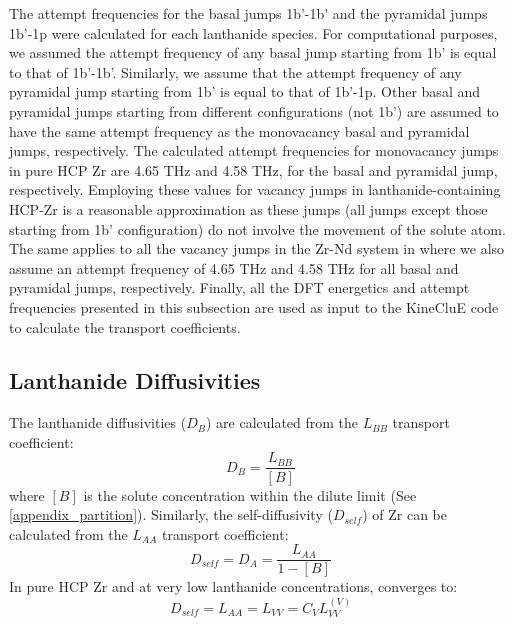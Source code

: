 \documentclass[preprint,12pt]{elsarticle}
\begin{document}
The attempt frequencies for the basal jumps 1b'-1b' and the pyramidal jumps 1b'-1p were calculated for each lanthanide species. For computational purposes, we assumed the attempt frequency of any basal jump starting from 1b' is equal to that of 1b'-1b'. Similarly, we assume that the attempt frequency of any pyramidal jump starting from 1b' is equal to that of 1b'-1p. Other basal and pyramidal jumps starting from different configurations (not 1b') are assumed to have the same attempt frequency as the monovacancy basal and pyramidal jumps, respectively. The calculated attempt frequencies for monovacancy jumps in pure HCP Zr are 4.65 THz and 4.58 THz, for the basal and pyramidal jump, respectively. Employing these values for vacancy jumps in lanthanide-containing HCP-Zr is a reasonable approximation as these jumps (all jumps except those starting from 1b' configuration) do not involve the movement of the solute atom. The same applies to all the vacancy jumps in the Zr-Nd system in  where we also assume an attempt frequency of 4.65 THz and 4.58 THz for all basal and pyramidal jumps, respectively. Finally, all the DFT energetics and attempt frequencies presented in this subsection are used as input to the KineCluE code\cite{schuler_kineclue_2020} to calculate the transport coefficients.

\FloatBarrier

\subsection{Lanthanide Diffusivities}
\label{subsection_diffusivities}

The lanthanide diffusivities ($D_B$) are calculated from the $L_{BB}$ transport coefficient:
\begin{equation}
    D_B = \frac{L_{BB}}{[B]}
\end{equation}
where $[B]$ is the solute concentration within the dilute limit (See \ref{appendix_partition}). Similarly, the self-diffusivity ($D_{self}$) of Zr can be calculated from the $L_{AA}$ transport coefficient:
\begin{equation}
    D_{self} = D_A = \frac{L_{AA}}{1-[B]}
\label{eq_self_diff}
\end{equation}
In pure HCP Zr and at very low lanthanide concentrations,  converges to:
\begin{equation}
    D_{self} = L_{AA} = L_{VV} = C_V L_{VV}^{(V)}
\end{equation}
\end{document}
